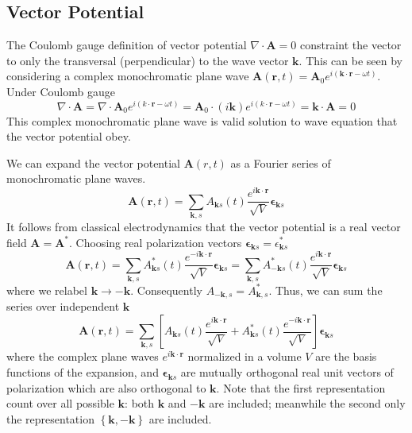 \documentclass[../../../main.tex]{subfiles}
\begin{document}
\subsection{Vector Potential}
The Coulomb gauge definition of vector potential $\nabla \cdot  \mathbf{A}=0$ constraint the vector to only the transversal (perpendicular) to the wave vector $\mathbf{k}$.
This can be seen by considering a complex monochromatic plane wave $\mathbf{A}(\mathbf{r},t)=\mathbf{A}_0 e^{i(\mathbf{k}\cdot \mathbf{r }-\omega t)}$.
Under Coulomb gauge
\begin{equation*}
  \nabla  \cdot \mathbf{A}=  \nabla \cdot  \mathbf{A}_0  e^{i(k \cdot \mathbf{r} - \omega t)} = \mathbf{A}_0 \cdot (i \mathbf{k}) e^{i(k \cdot \mathbf{r} - \omega t)} = \mathbf{k } \cdot \mathbf{A} = 0
\end{equation*}
This complex monochromatic plane wave is valid solution to wave equation that the vector potential obey.

We can expand the vector potential $\mathbf{A}(r, t)$ as a Fourier series of monochromatic plane waves.
\begin{equation*}
  \mathbf{A}(\mathbf{r}, t)
  = \sum_{\mathbf{k},s} A_{\mathbf{k} s}(t) \frac{e^{i \mathbf{k} \cdot \mathbf{r}}}{\sqrt{V}} \boldsymbol{\epsilon}_{\mathbf{k} s}
\end{equation*}
It follows from  classical electrodynamics that the vector potential is a real vector field $\mathbf{A} = \mathbf{A}^*$.
Choosing real polarization vectors $\boldsymbol{\epsilon}_{\mathbf{k} s}=\epsilon ^*_{\mathbf{k} s}$
\begin{equation*}
  \mathbf{A}(\mathbf{r},t) = \sum_{\mathbf{k},s} A^*_{\mathbf{k} s}(t)  \frac{e^{-i \mathbf{k} \cdot \mathbf{r}}}{\sqrt{V}}\boldsymbol{\epsilon}_{\mathbf{k} s}
  = \sum_{\mathbf{k},s} A^*_{-\mathbf{k} s}(t)  \frac{e^{i \mathbf{k} \cdot \mathbf{r}}}{\sqrt{V}}\boldsymbol{\epsilon}_{\mathbf{k} s}
\end{equation*}
where we relabel $\mathbf{k} \rightarrow -\mathbf{k}$.
Consequently $A_{-\mathbf{k},s}=A^*_{\mathbf{k},s}$.
Thus, we can sum the series over independent $\mathbf{k}$
\begin{equation*}
  \mathbf{A}(\mathbf{r}, t) = \sum_{\mathbf{k},s} \left[ A_{\mathbf{k}s}(t) \frac{e^{i\mathbf{k} \cdot \mathbf{r}}}{\sqrt{V}} + A_{\mathbf{k}s}^*(t) \frac{e^{-i\mathbf{k} \cdot \mathbf{r}}}{\sqrt{V}} \right] \boldsymbol{\epsilon}_{\mathbf{k}s}
\end{equation*}
where the complex plane waves $e^{i \mathbf{k } \cdot \mathbf{r}}$ normalized in a volume $V$ are the basis functions of the expansion, and $\boldsymbol{\epsilon}_{\mathbf{k}s}$ are mutually orthogonal real unit vectors of polarization which are also orthogonal to $\mathbf{k}$.
Note that the first representation count over all possible $\mathbf{k}$: both $\mathbf{k}$ and $-\mathbf{k}$ are included; meanwhile the second only the representation $\left\{ \mathbf{k},-\mathbf{k} \right\} $ are included.
\end{document}
